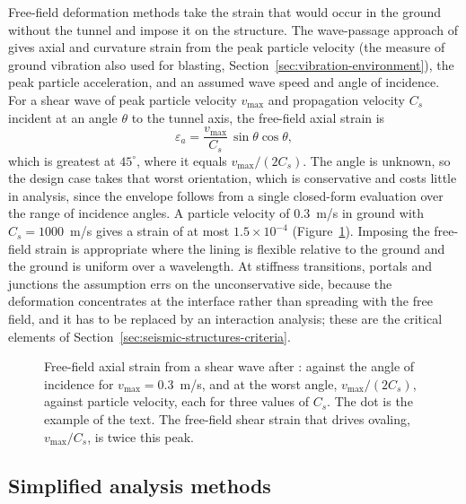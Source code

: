 Free-field deformation methods take the strain that would occur in the ground
without the tunnel and impose it on the structure. The wave-passage approach of
\citet{newmark1968problems} gives axial and curvature strain from the peak particle velocity
(the measure of ground vibration also used for blasting,
Section~\ref{sec:vibration-environment}), the peak particle
acceleration, and an assumed wave speed and angle of incidence. For a shear
wave of peak particle velocity $v_{\max}$ and propagation velocity $C_s$
incident at an angle $\theta$ to the tunnel axis, the free-field axial
strain is
\[
\varepsilon_a = \frac{v_{\max}}{C_s}\,\sin\theta\cos\theta ,
\]
which is greatest at $45^\circ$, where it equals $v_{\max}/(2C_s)$. The angle
is unknown, so the design case takes that worst orientation, which is
conservative and costs little in analysis, since the envelope follows from a
single closed-form evaluation over the range of incidence angles. A particle
velocity of 0.3~m/s in ground with
$C_s = 1000$~m/s gives a strain of at most $1.5 \times 10^{-4}$
(Figure~\ref{fig:free-field-strain}). Imposing the
free-field strain is appropriate where the lining is flexible relative to the
ground and the ground is uniform over a wavelength. At stiffness transitions,
portals and junctions the assumption errs on the unconservative side, because
the deformation concentrates at the interface rather than spreading with the
free field, and it has to be replaced by an interaction analysis; these are
the critical elements of Section~\ref{sec:seismic-structures-criteria}.

\begin{figure}[htbp]
\centering
{}
\caption{Free-field axial strain from a shear wave after \citet{newmark1968problems}: against the angle of incidence for $v_{\max} = 0.3$~m/s, and at the worst angle, $v_{\max}/(2C_s)$, against particle velocity, each for three values of $C_s$. The dot is the example of the text. The free-field shear strain that drives ovaling, $v_{\max}/C_s$, is twice this peak.}
\label{fig:free-field-strain}
\end{figure}

\subsection{Simplified analysis methods}
\label{sec:simplified-seismic}

